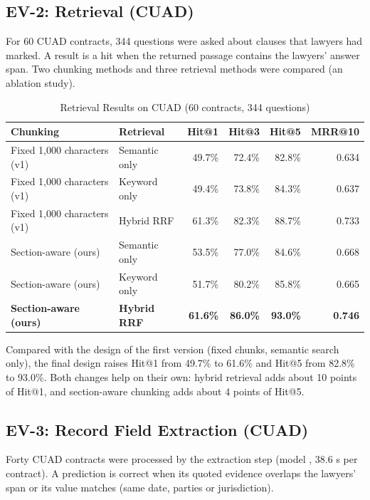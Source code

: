 \subsection{EV-2: Retrieval (CUAD)}
For 60 CUAD contracts, 344 questions were asked about clauses that lawyers had marked. A result is a
hit when the returned passage contains the lawyers' answer span. Two chunking methods and three
retrieval methods were compared (an ablation study).

\begin{table}[H]\centering
\caption{Retrieval Results on CUAD (60 contracts, 344 questions)}\label{tab:ev-retrieval}
\begin{tabularx}{\textwidth}{|X|l|r|r|r|r|}\hline
\textbf{Chunking} & \textbf{Retrieval} & \textbf{Hit@1} & \textbf{Hit@3} & \textbf{Hit@5} & \textbf{MRR@10} \\ \hline
Fixed 1,000 characters (v1) & Semantic only & 49.7\% & 72.4\% & 82.8\% & 0.634 \\ \hline
Fixed 1,000 characters (v1) & Keyword only & 49.4\% & 73.8\% & 84.3\% & 0.637 \\ \hline
Fixed 1,000 characters (v1) & Hybrid RRF & 61.3\% & 82.3\% & 88.7\% & 0.733 \\ \hline
Section-aware (ours) & Semantic only & 53.5\% & 77.0\% & 84.6\% & 0.668 \\ \hline
Section-aware (ours) & Keyword only & 51.7\% & 80.2\% & 85.8\% & 0.665 \\ \hline
\textbf{Section-aware (ours)} & \textbf{Hybrid RRF} & \textbf{61.6\%} & \textbf{86.0\%} & \textbf{93.0\%} & \textbf{0.746} \\ \hline
\end{tabularx}
\end{table}
Compared with the design of the first version (fixed chunks, semantic search only), the final design
raises Hit@1 from 49.7\% to 61.6\% and Hit@5 from 82.8\% to 93.0\%. Both changes help on their own:
hybrid retrieval adds about 10 points of Hit@1, and section-aware chunking adds about 4 points of Hit@5.

\subsection{EV-3: Record Field Extraction (CUAD)}
Forty CUAD contracts were processed by the extraction step (model , 38.6 s per
contract). A prediction is correct when its quoted evidence overlaps the lawyers' span or its value
matches (same date, parties or jurisdiction).

